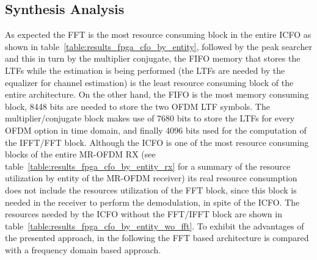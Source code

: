   
\subsection{Synthesis Analysis}
\label{subsec:results_analysis}

As expected the FFT is the most resource consuming block in the entire ICFO as shown in table~\ref{table:results_fpga_cfo_by_entity}, followed by the peak searcher and this in turn by the multiplier conjugate, the FIFO memory that stores the LTFs while the estimation is being performed (the LTFs are needed by the equalizer for channel estimation) is the least resource consuming block of the entire architecture. On the other hand, the FIFO is the most memory consuming block, 8448 bits are needed to store the two OFDM LTF symbols. The multiplier/conjugate block makes use of 7680 bits to store the LTFs for every OFDM option in time domain, and finally 4096 bits used for the computation of the IFFT/FFT block. Although the ICFO is one of the most resource consuming blocks of the entire MR-OFDM RX (see table~\ref{table:results_fpga_cfo_by_entity_rx} for a summary of the resource utilization by entity of the MR-OFDM receiver) its real resource consumption does not include the resources utilization of the FFT block, since this block is needed in the receiver to perform the demodulation, in spite of the ICFO. The resources needed by the ICFO without the FFT/IFFT block are shown in table~\ref{table:results_fpga_cfo_by_entity_wo_fft}. To exhibit the advantages of the presented approach, in the following the FFT based architecture is compared with a frequency domain based approach.   




